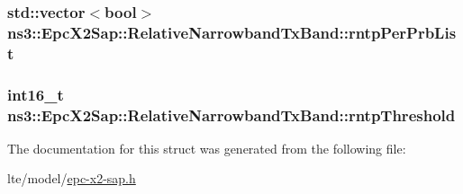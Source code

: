 \subsubsection[{\texorpdfstring{rntp\+Per\+Prb\+List}{rntpPerPrbList}}]{\setlength{\rightskip}{0pt plus 5cm}std\+::vector$<$bool$>$ ns3\+::\+Epc\+X2\+Sap\+::\+Relative\+Narrowband\+Tx\+Band\+::rntp\+Per\+Prb\+List}\hypertarget{structns3_1_1EpcX2Sap_1_1RelativeNarrowbandTxBand_a81b4e4130a84656a158c0f14ab123bdf}{}\label{structns3_1_1EpcX2Sap_1_1RelativeNarrowbandTxBand_a81b4e4130a84656a158c0f14ab123bdf}
\subsubsection[{\texorpdfstring{rntp\+Threshold}{rntpThreshold}}]{\setlength{\rightskip}{0pt plus 5cm}int16\+\_\+t ns3\+::\+Epc\+X2\+Sap\+::\+Relative\+Narrowband\+Tx\+Band\+::rntp\+Threshold}\hypertarget{structns3_1_1EpcX2Sap_1_1RelativeNarrowbandTxBand_a06750a129be794295dbd7b537eb61c8a}{}\label{structns3_1_1EpcX2Sap_1_1RelativeNarrowbandTxBand_a06750a129be794295dbd7b537eb61c8a}


The documentation for this struct was generated from the following file\+:\begin{DoxyCompactItemize}
\item 
lte/model/\hyperlink{epc-x2-sap_8h}{epc-\/x2-\/sap.\+h}\end{DoxyCompactItemize}
